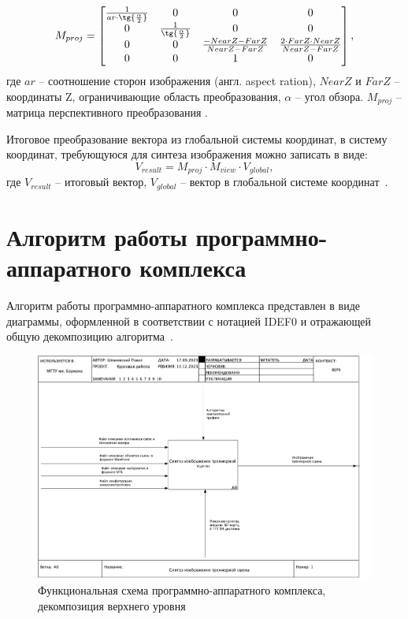 \begin{equation}
M_{proj} = 
\begin{bmatrix}
    \frac{1}{ar \cdot \tg{\frac{\alpha}{2}}} & 0 & 0 & 0 \\
    0 & \frac{1}{\tg{\frac{\alpha}{2}}} & 0 & 0 \\
    0 & 0 & \frac{-NearZ-FarZ}{NearZ-FarZ} & \frac{2 \cdot FarZ \cdot NearZ}{NearZ-FarZ} \\
    0   &  0  &  1  & 0 \\  
\end{bmatrix},
\end{equation}
где $ar$ -- соотношение сторон изображения (англ. aspect ration), $NearZ$ и $FarZ$ -- координаты Z, ограничивающие область преобразования, $\alpha$ -- угол обзора. $M_{proj}$ -- матрица перспективного преобразования \cite{perspective}. 

Итоговое преобразование вектора из глобальной системы координат, в систему координат, требующуюся для синтеза изображения можно записать в виде:
\begin{equation}
V_{result} = M_{proj} \cdot M_{view} \cdot V_{global},
\end{equation}
где $V_{result}$ -- итоговый вектор, $V_{global}$ -- вектор в глобальной системе координат~\cite{projection}.

\section{Алгоритм работы программно-аппаратного комплекса}

Алгоритм работы программно-аппаратного комплекса представлен в виде диаграммы, оформленной в
соответствии с нотацией IDEF0 и отражающей общую декомпозицию
алгоритма~\cite{idef0}.

\begin{figure}[H]
	\centering
	\includegraphics[height=0.45\textheight]{inc/img/01_A0.pdf}
	\caption{Функциональная схема программно-аппаратного комплекса, декомпозиция верхнего уровня}
	\label{fig:a01}
\end{figure}

